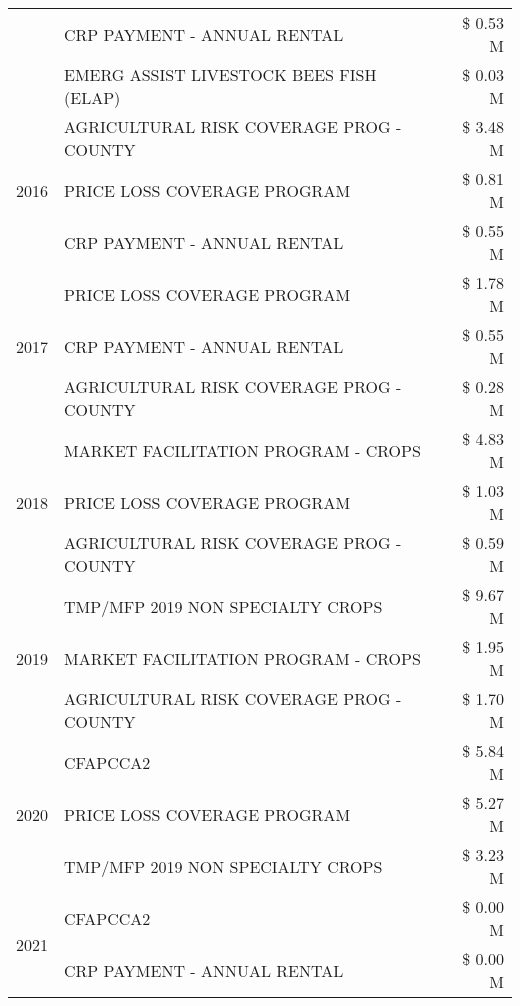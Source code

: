 \begin{tabular}{llr}
 & CRP PAYMENT - ANNUAL RENTAL & \$ 0.53 M \\
 & EMERG ASSIST LIVESTOCK BEES FISH (ELAP) & \$ 0.03 M \\
\cline{1-3}
\multirow[t]{3}{*}{2016} & AGRICULTURAL RISK COVERAGE PROG - COUNTY & \$ 3.48 M \\
 & PRICE LOSS COVERAGE PROGRAM & \$ 0.81 M \\
 & CRP PAYMENT - ANNUAL RENTAL & \$ 0.55 M \\
\cline{1-3}
\multirow[t]{3}{*}{2017} & PRICE LOSS COVERAGE PROGRAM & \$ 1.78 M \\
 & CRP PAYMENT - ANNUAL RENTAL & \$ 0.55 M \\
 & AGRICULTURAL RISK COVERAGE PROG - COUNTY & \$ 0.28 M \\
\cline{1-3}
\multirow[t]{3}{*}{2018} & MARKET FACILITATION PROGRAM - CROPS & \$ 4.83 M \\
 & PRICE LOSS COVERAGE PROGRAM & \$ 1.03 M \\
 & AGRICULTURAL RISK COVERAGE PROG - COUNTY & \$ 0.59 M \\
\cline{1-3}
\multirow[t]{3}{*}{2019} & TMP/MFP 2019 NON SPECIALTY CROPS & \$ 9.67 M \\
 & MARKET FACILITATION PROGRAM - CROPS & \$ 1.95 M \\
 & AGRICULTURAL RISK COVERAGE PROG - COUNTY & \$ 1.70 M \\
\cline{1-3}
\multirow[t]{3}{*}{2020} & CFAPCCA2 & \$ 5.84 M \\
 & PRICE LOSS COVERAGE PROGRAM & \$ 5.27 M \\
 & TMP/MFP 2019 NON SPECIALTY CROPS & \$ 3.23 M \\
\cline{1-3}
\multirow[t]{2}{*}{2021} & CFAPCCA2 & \$ 0.00 M \\
 & CRP PAYMENT - ANNUAL RENTAL & \$ 0.00 M \\
\cline{1-3}
\bottomrule
\end{tabular}
